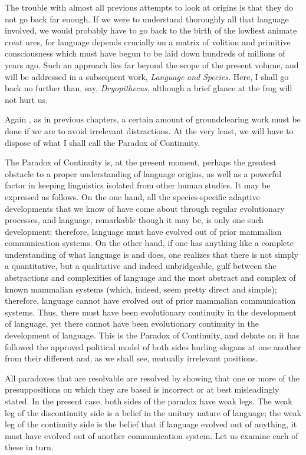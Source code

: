The trouble with almost all previous attempts to look at origins is that they do not go back far enough. If we were to understand thoroughly all that language involved, we would probably have to go back to the birth of the lowliest animate creat ures, for language depends crucially on a matrix of volition and primitive consciousness which must have begun to be laid down hundreds of millions of years ago. Such an approach lies far beyond the scope of the present volume, and will be addressed in a subsequent work, \textit{Language} \textit{and} \textit{Species.} Here, I shall go back no further than, say, \textit{Dryopithecus,} although a brief glance at the frog will not hurt us.

Again , as in previous chapters, a certain amount of ground\-clearing work must be done if we are to avoid irrelevant distractions. At the very least, we will have to dispose of what I shall call the Para\-dox of Continuity.

The Paradox of Continuity is, at the present moment, perhaps the greatest obstacle to a proper understanding of language origins, as well as a powerful factor in keeping linguistics isolated from other human studies. It may be expressed as follows. On the one hand, all the species-specific adaptive developments that we know of have come about through regular evolutionary processes, and language, remarkable though it may be, is only one such development; therefore, language must have evolved out of prior mammalian communication systems. On the other hand, if one has anything like a complete understanding of what language is and does, one realizes that there is not simply a quantitative, but a qualitative and indeed unbridgeable, gulf between
the abstractions and complexities of language and the most abstract and complex of known mammalian systems (which, indeed, seem pretty direct and simple); therefore, language cannot have evolved out of prior mammalian communication systems. Thus, there must have been evolutionary continuity in the development of language, yet there cannot have been evolutionary continuity in the development of language. This is the Paradox of Continuity, and debate on it has followed the approved political model of both sides hurling slogans at one another from their different and, as we shall see, mutually irrele\-vant positions.

All paradoxes that are resolvable are resolved by showing that one or more of the presuppositions on which they are based is incorrect or at best misleadingly stated. In the present case, both sides of the paradox have weak legs. The weak leg of the discontinuity side is a belief in the unitary nature of language; the weak leg of the continuity side is the belief that if language evolved out of anything, it must have evolved out of another communication system. Let us examine each of these in turn.

